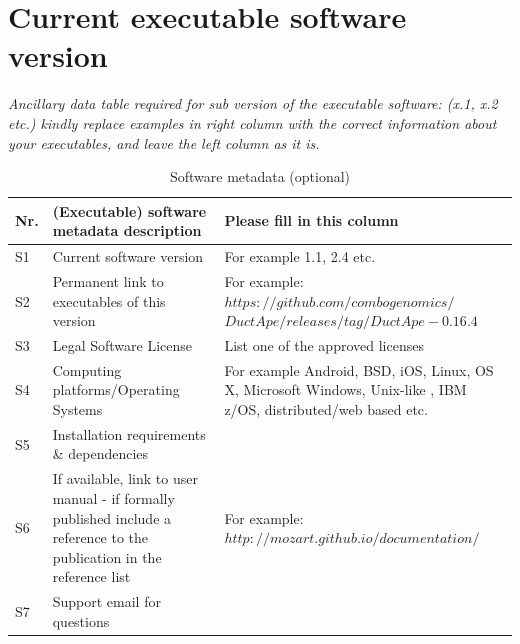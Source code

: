 \documentclass[preprint,12pt, a4paper]{elsarticle}
\begin{document}
\section*{Current executable software version}\label{sec:bin_version}

{\em Ancillary data table required for sub version of the executable
software: (x.1, x.2 etc.) kindly replace examples in right column with the
correct information about your executables, and leave the left column as it
is.

\begin{table}[!ht]
\begin{tabular}{|l|p{6.5cm}|p{6.5cm}|}
\hline
\textbf{Nr.} & 
\textbf{(Executable) software metadata description} & 
\textbf{Please fill in this column} \\
\hline
S1 & 
Current software version & 
For example 1.1, 2.4 etc. \\
\hline
S2 & 
Permanent link to executables of this version  & 
For example: $https://github.com/combogenomics/$ $DuctApe/releases/tag/DuctApe-0.16.4$ 
\\
\hline
S3 & 
Legal Software License & 
List one of the approved licenses \\
\hline
S4 & 
Computing platforms/Operating Systems & 
For example Android, BSD, iOS, Linux, OS X, Microsoft Windows, Unix-like , IBM z/OS, distributed/web based etc. \\
\hline
S5 & 
Installation requirements \& dependencies & 
\\
\hline
S6 & 
If available, link to user manual - if formally published include a reference to the publication in the reference list & 
For example: $http://mozart.github.io/documentation/$ \\
\hline
S7 & 
Support email for questions & 
\\
\hline
\end{tabular}
\caption{Software metadata (optional)}
\label{tab:bin_metadata} 
\end{table}}
\end{document}
